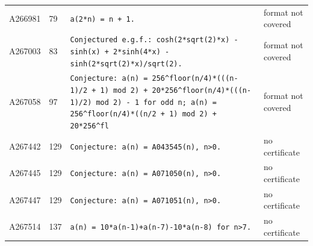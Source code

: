 \documentclass[11pt]{article}
\theoremstyle{definition}
\theoremstyle{remark}
\begin{document}
{\begin{longtable}{p{1.3cm}p{0.7cm}p{10cm}p{3cm}}
A266981 & 79 & \texttt{a(2*\allowbreak{}n)\allowbreak{} \allowbreak{}=\allowbreak{} \allowbreak{}n \allowbreak{}+\allowbreak{} \allowbreak{}1.} & format not covered \\
A267003 & 83 & \texttt{Conjectured \allowbreak{}e.g.f.: \allowbreak{}cosh(2*\allowbreak{}sqrt(2)\allowbreak{}*\allowbreak{}x)\allowbreak{} \allowbreak{}-\allowbreak{} \allowbreak{}sinh(x)\allowbreak{} \allowbreak{}+\allowbreak{} \allowbreak{}2*\allowbreak{}sinh(4*\allowbreak{}x)\allowbreak{} \allowbreak{}-\allowbreak{} \allowbreak{}sinh(2*\allowbreak{}sqrt(2)\allowbreak{}*\allowbreak{}x)\allowbreak{}/\allowbreak{}sqrt(2)\allowbreak{}.} & format not covered \\
A267058 & 97 & \texttt{Conjecture: \allowbreak{}a(n)\allowbreak{} \allowbreak{}=\allowbreak{} \allowbreak{}256\^{}floor(n/\allowbreak{}4)\allowbreak{}*\allowbreak{}(((n-\allowbreak{}1)\allowbreak{}/\allowbreak{}2 \allowbreak{}+\allowbreak{} \allowbreak{}1)\allowbreak{} \allowbreak{}mod \allowbreak{}2)\allowbreak{} \allowbreak{}+\allowbreak{} \allowbreak{}20*\allowbreak{}256\^{}floor(n/\allowbreak{}4)\allowbreak{}*\allowbreak{}(((n-\allowbreak{}1)\allowbreak{}/\allowbreak{}2)\allowbreak{} \allowbreak{}mod \allowbreak{}2)\allowbreak{} \allowbreak{}-\allowbreak{} \allowbreak{}1 \allowbreak{}for \allowbreak{}odd \allowbreak{}n; \allowbreak{}a(n)\allowbreak{} \allowbreak{}=\allowbreak{} \allowbreak{}256\^{}floor(n/\allowbreak{}4)\allowbreak{}*\allowbreak{}((n/\allowbreak{}2 \allowbreak{}+\allowbreak{} \allowbreak{}1)\allowbreak{} \allowbreak{}mod \allowbreak{}2)\allowbreak{} \allowbreak{}+\allowbreak{} \allowbreak{}20*\allowbreak{}256\^{}fl} & format not covered \\
A267442 & 129 & \texttt{Conjecture: \allowbreak{}a(n)\allowbreak{} \allowbreak{}=\allowbreak{} \allowbreak{}A043545(n)\allowbreak{},\allowbreak{} \allowbreak{}n>0.} & no certificate \\
A267445 & 129 & \texttt{Conjecture: \allowbreak{}a(n)\allowbreak{} \allowbreak{}=\allowbreak{} \allowbreak{}A071050(n)\allowbreak{},\allowbreak{} \allowbreak{}n>0.} & no certificate \\
A267447 & 129 & \texttt{Conjecture: \allowbreak{}a(n)\allowbreak{} \allowbreak{}=\allowbreak{} \allowbreak{}A071051(n)\allowbreak{},\allowbreak{} \allowbreak{}n>0.} & no certificate \\
A267514 & 137 & \texttt{a(n)\allowbreak{} \allowbreak{}=\allowbreak{} \allowbreak{}10*\allowbreak{}a(n-\allowbreak{}1)\allowbreak{}+\allowbreak{}a(n-\allowbreak{}7)\allowbreak{}-\allowbreak{}10*\allowbreak{}a(n-\allowbreak{}8)\allowbreak{} \allowbreak{}for \allowbreak{}n>7.} & no certificate \\

\end{longtable}}
\end{document}
